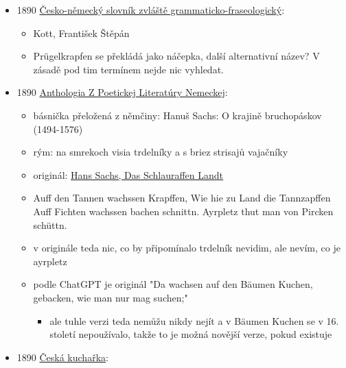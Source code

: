 \begin{itemize}
  \begin{itemize}
  \tightlist
  \item
    Slovensko, popis archeologický lokality, že nějaký bronzový "pušky"
    se dají roztáhnout jako trdelník (drúkový koláč)
  \end{itemize}
\item
  1890
  \href{https://ndk.cz/view/uuid:18b40310-07ad-11dd-8ccf-000d606f5dc6?page=uuid\%3Aae6c9544-ef09-495a-bf20-9e525fdb15b2&fulltext=Pr\%C3\%BCgelkrapfen}{Česko-německý
  slovník zvláště grammaticko-fraseologický}:

  \begin{itemize}
  \tightlist
  \item
    Kott, František Štěpán
  \item
    Prügelkrapfen se překládá jako náčepka, další alternativní název? V
    zásadě pod tim termínem nejde nic vyhledat.
  \end{itemize}
\item
  1890
  \href{https://dikda.snk.sk/uuid/uuid:f747b566-df1c-4c50-a3a8-7817d299de0e}{Anthologia
  Z Poetickej Literatúry Nemeckej}:

  \begin{itemize}
  \tightlist
  \item
    básnička přeložená z němčiny: Hanuš Sachs: O krajině bruchopáskov
    (1494-1576)
  \item
    rým: na smrekoch visia trdelníky \textbar{} a s briez strisajů
    vajačníky
  \item
    originál:
    \href{https://www.poemhunter.com/poem/das-schlauraffen-landt/}{Hans
    Sachs, Das Schlauraffen Landt}
  \item
    Auff den Tannen wachssen Krapffen, \textbar{} Wie hie zu Land die
    Tannzapffen \textbar{} Auff Fichten wachssen bachen schnittn.
    \textbar{} Ayrpletz thut man von Pircken schüttn.
  \item
    v originále teda nic, co by připomínalo trdelník nevidim, ale nevím,
    co je ayrpletz
  \item
    podle ChatGPT je originál "Da wachsen auf den Bäumen Kuchen,
    \textbar{} gebacken, wie man nur mag suchen;"

    \begin{itemize}
    \tightlist
    \item
      ale tuhle verzi teda nemůžu nikdy nejít a v Bäumen Kuchen se v 16.
      století nepoužívalo, takže to je možná novější verze, pokud
      existuje
    \end{itemize}
  \end{itemize}
\item
  1890
  \href{https://ndk.cz/uuid/uuid:19c84f90-966a-11dc-b8ab-000d606f5dc6}{Česká
  kuchařka}:


\end{itemize}
